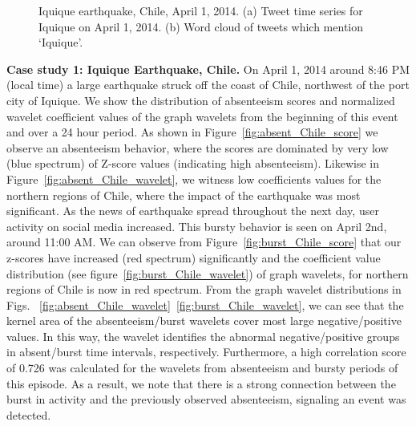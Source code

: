 \begin{figure}[t]
	\centering
\vspace{-2mm}	
	\caption{Iquique earthquake, Chile, April 1, 2014. (a) Tweet time series for Iquique on April 1, 2014. (b) Word cloud of tweets which mention `Iquique'.}
\label{fig:case1_cloud}
\end{figure}

\textbf{Case study 1: Iquique Earthquake, Chile.}
On April 1, 2014 around 8:46 PM (local time) a large earthquake struck off the coast of Chile, northwest of the port city of Iquique.
We show the distribution of absenteeism scores and normalized wavelet coefficient values of the graph wavelets from the beginning of this event and over a 24 hour period.
As shown in Figure~\ref{fig:absent_Chile_score} we observe an absenteeism behavior, where the scores are dominated by very low (blue spectrum) of Z-score values (indicating high absenteeism).
Likewise in Figure~\ref{fig:absent_Chile_wavelet}, we witness low coefficients values for the northern regions of Chile, where the impact of the earthquake was most significant.
As the news of earthquake spread throughout the next day, user activity on social media increased. This bursty behavior is seen on April 2nd, around 11:00 AM. We can observe from Figure~\ref{fig:burst_Chile_score} that our z-scores have increased (red spectrum) significantly and the coefficient value distribution (see figure~\ref{fig:burst_Chile_wavelet}) of graph wavelets, for northern regions of Chile is now in red spectrum.
From the graph wavelet distributions in Figs. ~\ref{fig:absent_Chile_wavelet}~\ref{fig:burst_Chile_wavelet}, we can see that the kernel area of the absenteeism/burst wavelets cover most large negative/positive values.
In this way, the wavelet identifies the abnormal negative/positive groups in absent/burst time intervals, respectively.
Furthermore, a high correlation score of 0.726 was calculated for the wavelets from absenteeism and bursty periods of this episode.
As a result, we note that there is a strong connection between the burst in activity and the previously observed absenteeism, signaling an event was detected.


